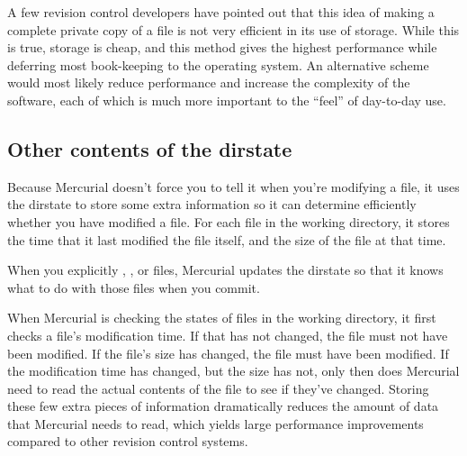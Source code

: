A few revision control developers have pointed out that this idea of
making a complete private copy of a file is not very efficient in its
use of storage.  While this is true, storage is cheap, and this method
gives the highest performance while deferring most book-keeping to the
operating system.  An alternative scheme would most likely reduce
performance and increase the complexity of the software, each of which
is much more important to the ``feel'' of day-to-day use.

\subsection{Other contents of the dirstate}

Because Mercurial doesn't force you to tell it when you're modifying a
file, it uses the dirstate to store some extra information so it can
determine efficiently whether you have modified a file.  For each file
in the working directory, it stores the time that it last modified the
file itself, and the size of the file at that time.  

When you explicitly , ,  or
 files, Mercurial updates the dirstate so that it knows
what to do with those files when you commit.

When Mercurial is checking the states of files in the working
directory, it first checks a file's modification time.  If that has
not changed, the file must not have been modified.  If the file's size
has changed, the file must have been modified.  If the modification
time has changed, but the size has not, only then does Mercurial need
to read the actual contents of the file to see if they've changed.
Storing these few extra pieces of information dramatically reduces the
amount of data that Mercurial needs to read, which yields large
performance improvements compared to other revision control systems.

